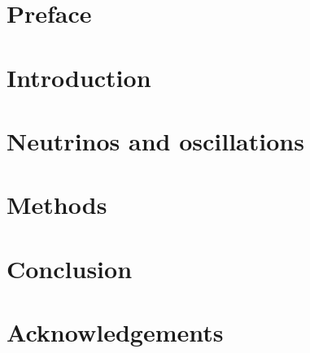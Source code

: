 \documentclass[11pt,twoside]{report} %
\begin{document}




\tableofcontents %

\thispagestyle{empty}

\clearpage
{}

\chapter*{Preface}


\chapter{Introduction}


\chapter{Neutrinos and oscillations}


\chapter{Methods}


%

\chapter{Conclusion}
\label{ch:conclusions}


\chapter*{Acknowledgements}




\end{document}
